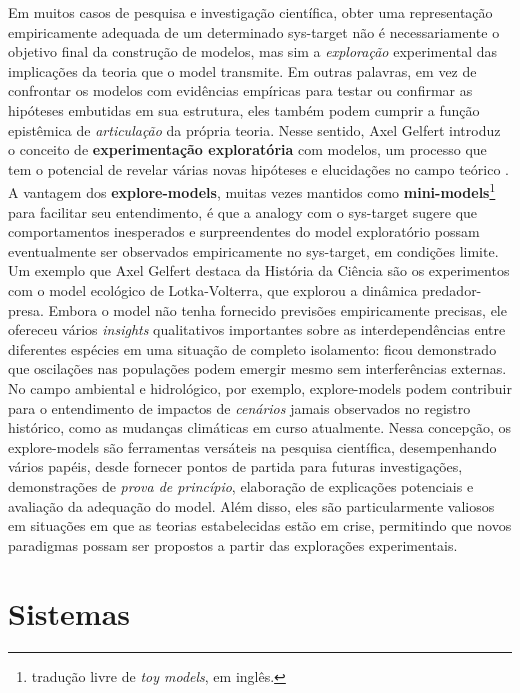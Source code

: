 \documentclass[./main.tex]{subfiles}
\begin{document}
\par Em muitos casos de pesquisa e investigação científica, obter uma representação empiricamente adequada de um determinado \gls{sys-target} não é necessariamente o objetivo final da construção de modelos, mas sim a \textit{exploração} experimental das implicações da \gls{teoria} que o \gls{model} transmite. Em outras palavras, em vez de confrontar os modelos com evidências empíricas para testar ou confirmar as hipóteses embutidas em sua estrutura, eles também podem cumprir a função epistêmica de \textit{articulação} da própria \gls{teoria}. Nesse sentido, Axel Gelfert introduz o conceito de \textbf{experimentação exploratória} com modelos, um processo que tem o potencial de revelar várias novas hipóteses e elucidações no campo teórico \cite{gelfert2016}. A vantagem dos \textbf{\gls{explore-models}}, muitas vezes mantidos como \textbf{\gls{mini-models}}\footnote{tradução livre de \textit{toy models}, em inglês.} para facilitar seu entendimento, é que a \gls{analogy} com o \gls{sys-target} sugere que comportamentos inesperados e surpreendentes do \gls{model} exploratório possam eventualmente ser observados empiricamente no \gls{sys-target}, em condições limite. Um exemplo que Axel Gelfert destaca da História da Ciência são os experimentos com o \gls{model} ecológico de Lotka-Volterra, que explorou a dinâmica predador-presa. Embora o \gls{model} não tenha fornecido previsões empiricamente precisas, ele ofereceu vários \textit{insights} qualitativos importantes sobre as interdependências entre diferentes espécies em uma situação de completo isolamento: ficou demonstrado que oscilações nas populações podem emergir mesmo sem interferências externas. No campo ambiental e hidrológico, por exemplo, \gls{explore-models} podem contribuir para o entendimento de impactos de \textit{cenários} jamais observados no registro histórico, como as mudanças climáticas em curso atualmente. Nessa concepção, os \gls{explore-models} são ferramentas versáteis na pesquisa científica, desempenhando vários papéis, desde fornecer pontos de partida para futuras investigações, demonstrações de \textit{prova de princípio}, elaboração de explicações potenciais e avaliação da adequação do \gls{model}. Além disso, eles são particularmente valiosos em situações em que as teorias estabelecidas estão em crise, permitindo que novos paradigmas possam ser propostos a partir das explorações experimentais.

\section{Sistemas} \label{sec:sys:systems}
\end{document}
